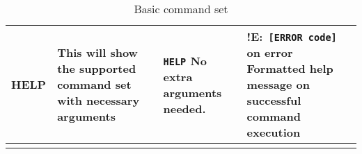 \begin{longtable} {|m{5em}|m{15em}|m{12.2em}|m{14em}|}
  HELP & This will show the supported command set with necessary arguments & \texttt{HELP} \newline No extra arguments needed. & !E:\texttt{ [ERROR code]} on error \newline Formatted help message on \newline successful command execution \\ \hline
  \caption{Basic command set}
  \label{tab:BasicCommandSet}
\end{longtable}

